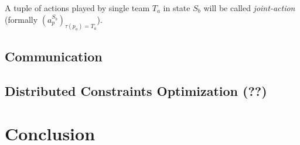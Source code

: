 A tuple of actions played by single team $T_a$ in state $S_b$ will be called \emph{joint-action} (formally
$(a_p^{S_b})_{\tau(p_a)=T_a}$).

\subsection{Communication}
\subsection{Distributed Constraints Optimization (??)}

\section{Conclusion}
